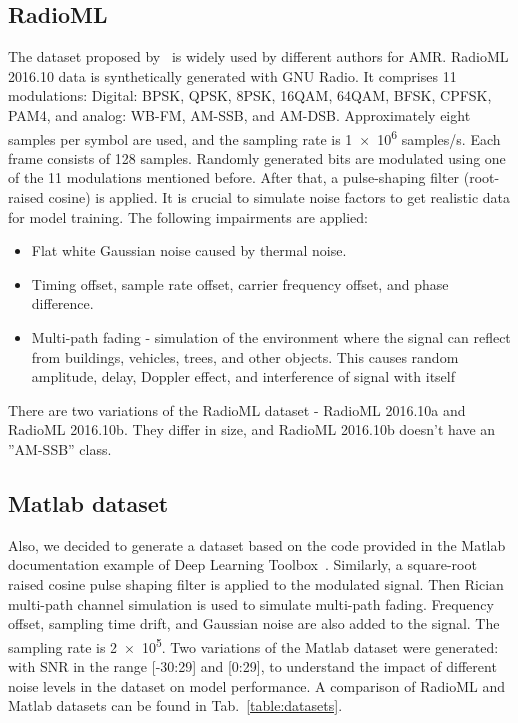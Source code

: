 \subsection{RadioML}

The dataset proposed by~\cite{cnn_dnn_simc} is widely used by different authors for AMR. RadioML 2016.10 data is synthetically generated with GNU Radio. It comprises 11 modulations: Digital: BPSK, QPSK, 8PSK, 16QAM, 64QAM, BFSK, CPFSK, PAM4, and analog: WB-FM, AM-SSB, and AM-DSB. Approximately eight samples per symbol are used, and the sampling rate is \num{1e6} samples/s. Each frame consists of 128 samples. Randomly generated bits are modulated using one of the 11 modulations mentioned before. After that, a pulse-shaping filter (root-raised cosine) is applied. It is crucial to simulate noise factors to get realistic data for model training. The following impairments are applied: 
\begin{itemize}
    \item Flat white Gaussian noise caused by thermal noise.
    \item Timing offset, sample rate offset, carrier frequency offset, and phase difference.
    \item Multi-path fading - simulation of the environment where the signal can reflect from buildings, vehicles, trees, and other objects. This causes random amplitude, delay, Doppler effect, and interference of signal with itself
\end{itemize}

There are two variations of the RadioML dataset - RadioML 2016.10a and RadioML 2016.10b. They differ in size, and RadioML 2016.10b doesn't have an ''AM-SSB'' class. 

\subsection{Matlab dataset}

Also, we decided to generate a dataset based on the code provided in the Matlab documentation example of Deep Learning Toolbox~\cite{matlab_model}. Similarly, a square-root raised cosine pulse shaping filter is applied to the modulated signal. Then Rician multi-path channel simulation is used to simulate multi-path fading. Frequency offset, sampling time drift, and Gaussian noise are also added to the signal. The sampling rate is \num{2e5}. Two variations of the Matlab dataset were generated: with SNR in the range [-30:29] and [0:29], to understand the impact of different noise levels in the dataset on model performance. A comparison of RadioML and Matlab datasets can be found in Tab.~\ref{table:datasets}.

